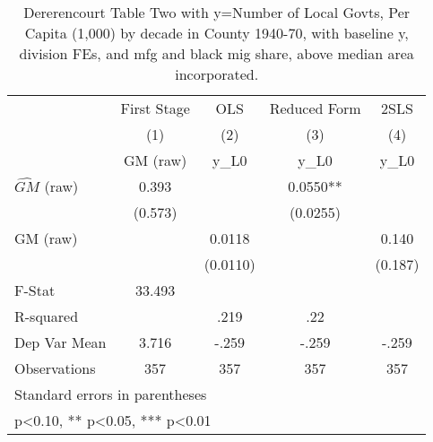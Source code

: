 \begin{table}[htbp]\centering
\def\sym#1{\ifmmode^{#1}\else\(^{#1}\)\fi}
\caption{Dererencourt Table Two with y=Number of Local Govts, Per Capita (1,000) by decade in County 1940-70, with baseline y, division FEs, and mfg and black mig share, above median area incorporated.}
\begin{tabular}{l*{4}{c}}
\toprule
                    & First Stage   &         OLS   &Reduced Form   &        2SLS   \\
                    &\multicolumn{1}{c}{(1)}&\multicolumn{1}{c}{(2)}&\multicolumn{1}{c}{(3)}&\multicolumn{1}{c}{(4)}\\
                    &\multicolumn{1}{c}{GM  (raw)}&\multicolumn{1}{c}{y\_L0}&\multicolumn{1}{c}{y\_L0}&\multicolumn{1}{c}{y\_L0}\\
\midrule
$\hat{GM}$ (raw)    &       0.393   &               &      0.0550** &               \\
                    &     (0.573)   &               &    (0.0255)   &               \\
\addlinespace
GM  (raw)           &               &      0.0118   &               &       0.140   \\
                    &               &    (0.0110)   &               &     (0.187)   \\
\midrule
F-Stat              &      33.493   &               &               &               \\
R-squared           &               &        .219   &         .22   &               \\
Dep Var Mean        &       3.716   &       -.259   &       -.259   &       -.259   \\
Observations        &         357   &         357   &         357   &         357   \\
\bottomrule
\multicolumn{5}{l}{\footnotesize Standard errors in parentheses}\\
\multicolumn{5}{l}{\footnotesize * p<0.10, ** p<0.05, *** p<0.01}\\
\end{tabular}
\end{table}
